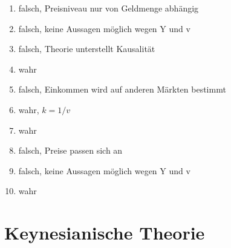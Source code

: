 \documentclass{scrartcl}
\begin{document}
\begin{enumerate}
\item falsch, Preisniveau nur von Geldmenge abh\"{a}ngig
\item falsch, keine Aussagen m\"{o}glich wegen Y und v
\item falsch, Theorie unterstellt Kausalit\"{a}t
\item wahr
\item falsch, Einkommen wird auf anderen M\"{a}rkten bestimmt
\item wahr, $k=1/v$
\item wahr
\item falsch, Preise passen sich an
\item falsch, keine Aussagen m\"{o}glich wegen Y und v
\item wahr
\end{enumerate}




\section{Keynesianische Theorie}
\end{document}
